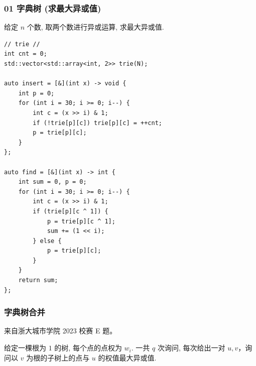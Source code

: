 \documentclass[UTF8, a4paper, titlepage, twoside]{ctexart}
\begin{document}
\subsubsection*{ 01 字典树 (求最大异或值) }

给定 $n$ 个数, 取两个数进行异或运算, 求最大异或值.

\begin{lstlisting}[style=cpp]
// trie //
int cnt = 0;
std::vector<std::array<int, 2>> trie(N);

auto insert = [&](int x) -> void {
    int p = 0;
    for (int i = 30; i >= 0; i--) {
        int c = (x >> i) & 1;
        if (!trie[p][c]) trie[p][c] = ++cnt;
        p = trie[p][c];
    }
};

auto find = [&](int x) -> int {
    int sum = 0, p = 0;
    for (int i = 30; i >= 0; i--) {
        int c = (x >> i) & 1;
        if (trie[p][c ^ 1]) {
            p = trie[p][c ^ 1];
            sum += (1 << i);
        } else {
            p = trie[p][c];
        }
    }
    return sum;
};
\end{lstlisting}

\subsubsection*{ 字典树合并 }

来自浙大城市学院 2023 校赛 E 题。

给定一棵根为 $1$ 的树, 每个点的点权为 $w_i$.
一共 $q$ 次询问, 每次给出一对 $u, v$，询问以 $v$ 为根的子树上的点与 $u$ 的权值最大异或值.
\end{document}
